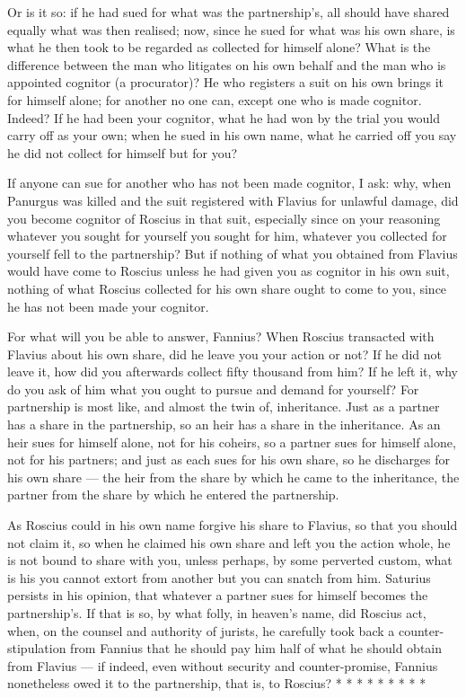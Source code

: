  Or is it so: if he had sued for what was the partnership's, all should have shared equally what was then realised; now, since he sued for what was his own share, is what he then took to be regarded as collected for himself alone? What is the difference between the man who litigates on his own behalf and the man who is appointed cognitor (a procurator)? He who registers a suit on his own brings it for himself alone; for another no one can, except one who is made cognitor. Indeed? If he had been your cognitor, what he had won by the trial you would carry off as your own; when he sued in his own name, what he carried off you say he did not collect for himself but for you?

 If anyone can sue for another who has not been made cognitor, I ask: why, when Panurgus was killed and the suit registered with Flavius for unlawful damage, did you become cognitor of Roscius in that suit, especially since on your reasoning whatever you sought for yourself you sought for him, whatever you collected for yourself fell to the partnership? But if nothing of what you obtained from Flavius would have come to Roscius unless he had given you as cognitor in his own suit, nothing of what Roscius collected for his own share ought to come to you, since he has not been made your cognitor.

 For what will you be able to answer, Fannius? When Roscius transacted with Flavius about his own share, did he leave you your action or not? If he did not leave it, how did you afterwards collect fifty thousand from him? If he left it, why do you ask of him what you ought to pursue and demand for yourself? For partnership is most like, and almost the twin of, inheritance. Just as a partner has a share in the partnership, so an heir has a share in the inheritance. As an heir sues for himself alone, not for his coheirs, so a partner sues for himself alone, not for his partners; and just as each sues for his own share, so he discharges for his own share --- the heir from the share by which he came to the inheritance, the partner from the share by which he entered the partnership.

 As Roscius could in his own name forgive his share to Flavius, so that you should not claim it, so when he claimed his own share and left you the action whole, he is not bound to share with you, unless perhaps, by some perverted custom, what is his you cannot extort from another but you can snatch from him. Saturius persists in his opinion, that whatever a partner sues for himself becomes the partnership's. If that is so, by what folly, in heaven's name, did Roscius act, when, on the counsel and authority of jurists, he carefully took back a counter-stipulation from Fannius that he should pay him half of what he should obtain from Flavius --- if indeed, even without security and counter-promise, Fannius nonetheless owed it to the partnership, that is, to Roscius? * * * * * * * * *

